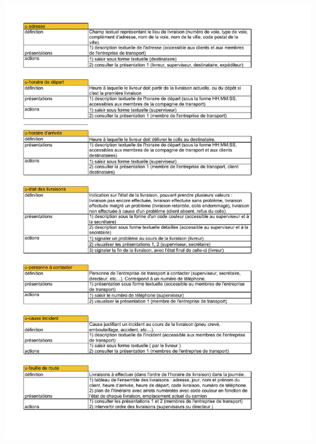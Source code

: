 \documentclass{report}
\begin{document}
\hypertarget{labDPOU}{}

\includegraphics[scale = 0.65, page = 1]{images/DPOU.pdf} 
\end{document}
